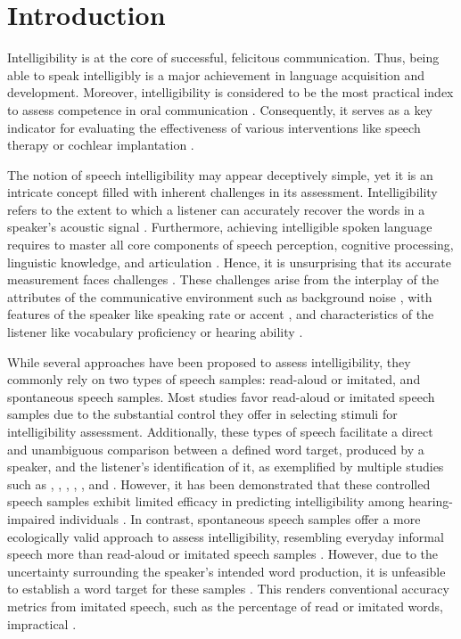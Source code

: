 \documentclass[
  authoryear,
  preprint,
  1p]{elsarticle}
\begin{document}
\section{Introduction}\label{sec-introduction}

Intelligibility is at the core of successful, felicitous communication.
Thus, being able to speak intelligibly is a major achievement in
language acquisition and development. Moreover, intelligibility is
considered to be the most practical index to assess competence in oral
communication \citep{Kent_et_al_1994}. Consequently, it serves as a key
indicator for evaluating the effectiveness of various interventions like
speech therapy or cochlear implantation \citep{Chin_et_al_2012}.

The notion of speech intelligibility may appear deceptively simple, yet
it is an intricate concept filled with inherent challenges in its
assessment. {Intelligibility refers to the extent to which a listener
can accurately recover the words in a speaker's acoustic signal
\citep{Freeman_et_al_2017, vanHeuven_2008, Whitehill_et_al_2004}.
Furthermore, achieving intelligible spoken language requires to master
all core components of speech perception, cognitive processing,
linguistic knowledge, and articulation \citep{Freeman_et_al_2017}.
Hence, it is unsurprising that its accurate measurement faces challenges
\citep{Kent_et_al_1989}. These challenges arise from the interplay of
the attributes of the communicative environment such as background noise
\citep{Munro_1998}, with features of the speaker like speaking rate
\citep{Munro_et_al_1998} or accent
\citep{Jenkins_2000, Ockey_et_al_2016}, and characteristics of the
listener like vocabulary proficiency or hearing ability
\citep{Varonis_et_al_1985}}.

While several approaches have been proposed to assess intelligibility,
they commonly rely on two types of speech samples: read-aloud or
imitated, and spontaneous speech samples. Most studies favor read-aloud
or imitated speech samples due to the substantial control they offer in
selecting stimuli for intelligibility assessment. Additionally, these
types of speech facilitate a direct and unambiguous comparison between a
defined word target, produced by a speaker, and the listener's
identification of it, as exemplified by multiple studies such as
\citet{Castellanos_et_al_2014}, \citet{Chin_et_al_2012},
\citet{Chin_et_al_2014}, \citet{Freeman_et_al_2017},
\citet{Khwaileh_et_al_2010}, and \citet{Montag_et_al_2014}. However, it
has been demonstrated that these controlled speech samples exhibit
limited efficacy in predicting intelligibility among hearing-impaired
individuals \citep{Cox_et_al_1989, Ertmer_2011}. {In contrast,
spontaneous speech samples offer a more ecologically valid approach to
assess intelligibility, resembling everyday informal speech more than
read-aloud or imitated speech samples \citep{Boonen_et_al_2023}.
However, due to the uncertainty surrounding the speaker's intended word
production, it is unfeasible to establish a word target for these
samples \citep{Flipsen_2006, Lagerberg_et_al_2014}. This renders
conventional accuracy metrics from imitated speech, such as the
percentage of read or imitated words, impractical
\citep{Boonen_et_al_2023}.}
\end{document}
